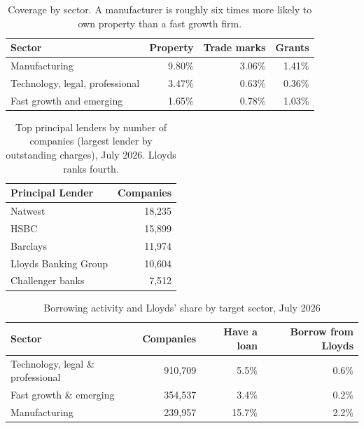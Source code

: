 \documentclass[    author={Samuel Menon Demelo; Sneha Saphala Ram Prasad; 
Viktor Ander Lindholm; Vishal Khatri},
               supervisor={Prof. Fernando Moreno-Pino},
                   degree={MSc},
                    title={Lloyds Commercial Banking Intelligence},
                 subtitle={Ranking SME Lending, Risk and Growth Prospects for Lloyds Banking Group},
                     type={},
                     year={2026}]{dissertation}
\begin{document}
\begin{collapsable}
\begin{table}[htbp]
\centering
\caption[Unstructured sources coverage by sector]{Coverage by sector. A manufacturer is roughly six times more likely to own
property than a fast growth firm.}
\label{tab:coverage-sector}
\begin{tabular}{lrrr}
\toprule
Sector & Property & Trade marks & Grants \\
\midrule
Manufacturing                   & 9.80\% & 3.06\% & 1.41\% \\
Technology, legal, professional & 3.47\% & 0.63\% & 0.36\% \\
Fast growth and emerging        & 1.65\% & 0.78\% & 1.03\% \\
\bottomrule
\end{tabular}
\end{table}
\end{collapsable}

\begin{collapsable}
\begin{table}[h]
\centering
\small\begin{tabular}{@{}lr@{}}
\toprule
\textbf{Principal Lender} & \textbf{Companies} \\
\midrule
Natwest    & 18{,}235\\
HSBC    & 15{,}899 \\
Barclays     & 11{,}974\\
Lloyds Banking Group & 10{,}604\\
Challenger banks & 7{,}512\\
\bottomrule
\end{tabular}
\caption[Top lenders by number of companies]{Top principal lenders by number of companies (largest lender by outstanding charges), July 2026. Lloyds ranks fourth.}
\label{tab:league}
\end{table}
\end{collapsable}

\begin{collapsable}
\begin{table}[h]
    \centering
    \small
    \begin{tabular}{@{}lrrr@{}}
    \toprule
    \textbf{Sector}& \textbf{Companies}& \textbf{Have a loan} & \textbf{Borrow from Lloyds}\\
    \midrule
    Technology, legal \& professional   & 910{,}709 & 5.5\% & 0.6\% \\
    Fast growth \& emerging & 354{,}537    & 3.4\% & 0.2\% \\
    Manufacturing & 239{,}957 & 15.7\% & 2.2\% \\
    \bottomrule
    \end{tabular}
    \caption{Borrowing activity and Lloyds' share by target sector, July 2026}
    \label{tab:sectorborrow}
\end{table}
\end{collapsable}
\end{document}
